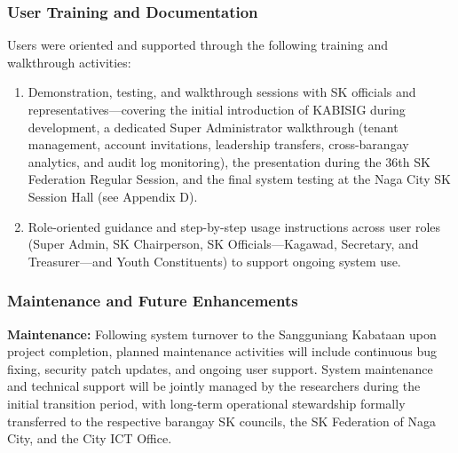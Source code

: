 \subsubsection{User Training and Documentation}
\label{subsubsec:user_training_and_documentation}

\noindent Users were oriented and supported through the following training and walkthrough activities:
\begin{enumerate}
    \item Demonstration, testing, and walkthrough sessions with SK officials and representatives---covering the initial introduction of KABISIG during development, a dedicated Super Administrator walkthrough (tenant management, account invitations, leadership transfers, cross-barangay analytics, and audit log monitoring), the presentation during the 36th SK Federation Regular Session, and the final system testing at the Naga City SK Session Hall (see Appendix D).
    \item Role-oriented guidance and step-by-step usage instructions across user roles (Super Admin, SK Chairperson, SK Officials---Kagawad, Secretary, and Treasurer---and Youth Constituents) to support ongoing system use.
\end{enumerate}

\subsubsection{Maintenance and Future Enhancements}
\label{subsubsec:maintenance_and_future_enhancements}

\textbf{Maintenance:} Following system turnover to the Sangguniang Kabataan upon project completion, planned maintenance activities will include continuous bug fixing, security patch updates, and ongoing user support. System maintenance and technical support will be jointly managed by the researchers during the initial transition period, with long-term operational stewardship formally transferred to the respective barangay SK councils, the SK Federation of Naga City, and the City ICT Office.

